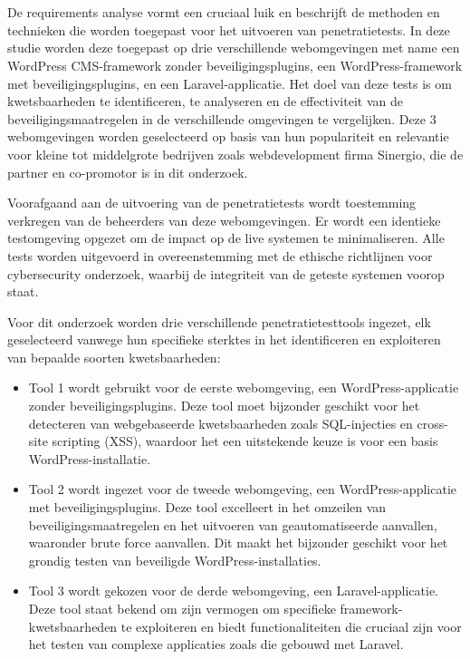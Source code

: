 \section{}
De requirements analyse vormt een cruciaal luik en beschrijft de methoden en technieken die worden toegepast 
voor het uitvoeren van penetratietests. In deze studie worden deze toegepast op drie 
verschillende webomgevingen met name een WordPress CMS-framework zonder beveiligingsplugins, een WordPress-framework met 
beveiligingsplugins, en een Laravel-applicatie. Het doel van deze tests is om kwetsbaarheden te identificeren, te 
analyseren en de effectiviteit van de beveiligingsmaatregelen in de verschillende omgevingen te vergelijken.
Deze 3 webomgevingen worden geselecteerd op basis van hun populariteit en relevantie voor kleine tot middelgrote bedrijven 
zoals webdevelopment firma Sinergio, die de partner en co-promotor is in dit onderzoek.

Voorafgaand aan de uitvoering van de penetratietests wordt toestemming verkregen van de beheerders van deze 
webomgevingen. Er wordt een identieke testomgeving opgezet om de impact op de live systemen te minimaliseren. 
Alle tests worden uitgevoerd in overeenstemming met de ethische richtlijnen voor cybersecurity onderzoek, 
waarbij de integriteit van de geteste systemen voorop staat.

Voor dit onderzoek worden drie verschillende penetratietesttools ingezet, elk geselecteerd vanwege hun 
specifieke sterktes in het identificeren en exploiteren van bepaalde soorten kwetsbaarheden:

\begin{itemize}
    \item Tool 1 wordt gebruikt voor de eerste webomgeving, een WordPress-applicatie zonder 
    beveiligingsplugins. Deze tool moet bijzonder geschikt voor het detecteren van webgebaseerde kwetsbaarheden 
    zoals SQL-injecties en cross-site scripting (XSS), waardoor het een uitstekende keuze is voor 
    een basis WordPress-installatie.
    \item Tool 2 wordt ingezet voor de tweede webomgeving, een WordPress-applicatie met beveiligingsplugins. 
    Deze tool excelleert in het omzeilen van beveiligingsmaatregelen en het uitvoeren van geautomatiseerde 
    aanvallen, waaronder brute force aanvallen. Dit maakt het bijzonder geschikt voor het grondig 
    testen van beveiligde WordPress-installaties.
    \item Tool 3 wordt gekozen voor de derde webomgeving, een Laravel-applicatie. Deze tool staat 
    bekend om zijn vermogen om specifieke framework-kwetsbaarheden te exploiteren en biedt functionaliteiten 
    die cruciaal zijn voor het testen van complexe applicaties zoals die gebouwd met Laravel.
\end{itemize}

